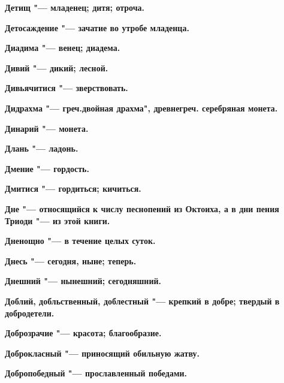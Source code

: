 \begin{mymulticols}{2}
\bfseries Детищ\normalfont{} "--- младенец; дитя; отроча. 




\bfseries Детосаждение\normalfont{} "--- зачатие во утробе младенца. 




\bfseries Диадима\normalfont{} "--- венец; диадема. 




\bfseries Дивий\normalfont{} "--- дикий; лесной. 




\bfseries Дивьячитися\normalfont{} "--- зверствовать. 




\bfseries Дидрахма\normalfont{} "--- греч.двойная драхма", древнегреч. серебряная монета. 




\bfseries Динарий\normalfont{} "--- монета. 




\bfseries Длань\normalfont{} "--- ладонь. 




\bfseries Дмение\normalfont{} "--- гордость. 




\bfseries Дмитися\normalfont{} "--- гордиться; кичиться. 




\bfseries Дне\normalfont{} "--- относящийся к числу песнопений из Октоиха, а в дни пения Триоди "--- из этой книги. 




\bfseries Дненощно\normalfont{} "--- в течение целых суток. 




\bfseries Днесь\normalfont{} "--- сегодня, ныне; теперь. 




\bfseries Днешний\normalfont{} "--- нынешний; сегодняшний. 




\bfseries Доблий, добльственный, доблестный\normalfont{} "--- крепкий в добре; твердый в добродетели. 




\bfseries Доброзрачие\normalfont{} "--- красота; благообразие. 




\bfseries Доброкласный\normalfont{} "--- приносящий обильную жатву. 




\bfseries Добропобедный\normalfont{} "--- прославленный победами. 





\end{mymulticols}
